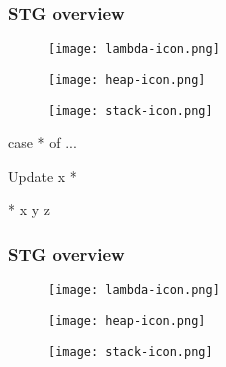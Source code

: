 \documentclass[bigger]{beamer}
\begin{document}
\begin{frame}[fragile]
\frametitle{STG overview}
\begin{center}

	\begin{minipage}{0.25\textwidth}
		\begin{figure}
			\texttt{[image: lambda-icon.png]}
		\end{figure}
	\end{minipage}
	\hfill
	\begin{minipage}{0.30\textwidth}
		\begin{figure}
			\texttt{[image: heap-icon.png]}
		\end{figure}
	\end{minipage}
	\hfill
	\begin{minipage}{0.30\textwidth}
		\vspace{1cm}
		\begin{figure}
			\texttt{[image: stack-icon.png]}
		\end{figure}
		\begin{haskellcode}
			case * of {...}
		\end{haskellcode}
		\pause
		\begin{haskellcode}
			Update x *
		\end{haskellcode}
		\pause
		\begin{haskellcode}
			* x y z
		\end{haskellcode}
	\end{minipage}

\end{center}
\end{frame}

\begin{frame}[fragile]
\frametitle{STG overview}
\begin{center}

	\begin{minipage}{0.25\textwidth}
		\begin{figure}
			\texttt{[image: lambda-icon.png]}
		\end{figure}
	\end{minipage}
	\hfill
	\begin{minipage}{0.30\textwidth}
		\begin{figure}
			\texttt{[image: heap-icon.png]}
		\end{figure}
	\end{minipage}
	\hfill
	\begin{minipage}{0.30\textwidth}
		\begin{figure}
			\texttt{[image: stack-icon.png]}
		\end{figure}
	\end{minipage}

\end{center}
\end{frame}
\end{document}
